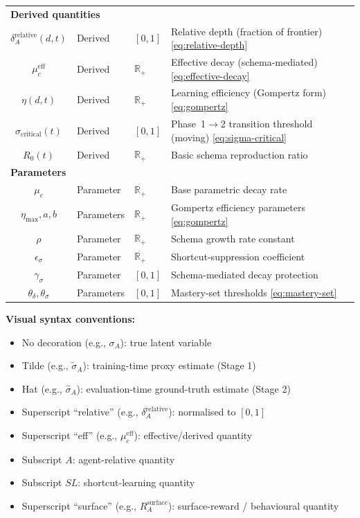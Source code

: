 \documentclass{article}
\theoremstyle{definition}
\newcommand{\R}{\mathbb{R}}
\begin{document}
\begin{center}
\begin{tabular}{c l l >{\raggedright\arraybackslash}p{4.2cm}}
\multicolumn{4}{l}{\textbf{Derived quantities}} \\
$\delta_A^{\text{relative}}(d,t)$ & Derived & $[0,1]$ & Relative depth (fraction of frontier) \hfill\eqref{eq:relative-depth} \\
$\mu_c^{\text{eff}}$ & Derived & $\R_+$ & Effective decay (schema-mediated) \hfill\eqref{eq:effective-decay} \\
$\eta(d,t)$ & Derived & $\R_+$ & Learning efficiency (Gompertz form) \hfill\eqref{eq:gompertz} \\
$\sigma_{\text{critical}}(t)$ & Derived & $[0,1]$ & Phase~1$\to$2 transition threshold (moving) \hfill\eqref{eq:sigma-critical} \\
$R_0(t)$ & Derived & $\R_+$ & Basic schema reproduction ratio \\
\multicolumn{4}{l}{\textbf{Parameters}} \\
$\mu_c$ & Parameter & $\R_+$ & Base parametric decay rate \\
$\eta_{\max}, a, b$ & Parameters & $\R_+$ & Gompertz efficiency parameters \hfill\eqref{eq:gompertz} \\
$\rho$ & Parameter & $\R_+$ & Schema growth rate constant \\
$\epsilon_\sigma$ & Parameter & $\R_+$ & Shortcut-suppression coefficient \\
$\gamma_\sigma$ & Parameter & $[0,1]$ & Schema-mediated decay protection \\
$\theta_\delta, \theta_\sigma$ & Parameters & $[0,1]$ & Mastery-set thresholds \hfill\eqref{eq:mastery-set} \\
\bottomrule
\end{tabular}
\end{center}

\textbf{Visual syntax conventions:}
\begin{itemize}[nosep]
\item No decoration (e.g., $\sigma_A$): true latent variable
\item Tilde (e.g., $\tilde{\sigma}_A$): training-time proxy estimate (Stage 1)
\item Hat (e.g., $\hat{\sigma}_A$): evaluation-time ground-truth estimate (Stage 2)
\item Superscript ``relative'' (e.g., $\delta_A^{\text{relative}}$): normalised to $[0,1]$
\item Superscript ``eff'' (e.g., $\mu_c^{\text{eff}}$): effective/derived quantity
\item Subscript $A$: agent-relative quantity
\item Subscript $SL$: shortcut-learning quantity
\item Superscript ``surface'' (e.g., $R_A^{\text{surface}}$): surface-reward / behavioural quantity
\end{itemize}
\end{document}
